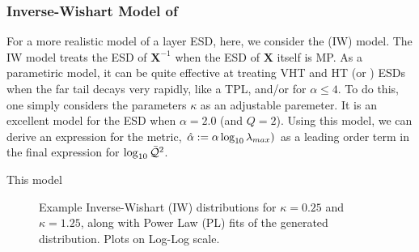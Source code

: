\subsubsection{Inverse-Wishart Model of \IdealLearning}
For a more realistic model of a layer ESD, 
here, we consider the \InverseWishart (IW) model.
The IW model treats the ESD of $\mathbf{X}^{-1}$ when the ESD of $\mathbf{X}$ itself is MP.
As a parametiric model, it can be quite effective at treating VHT and HT (or \FatTailed) ESDs when the far tail decays very rapidly, like a TPL, and/or for $\alpha\le 4$.
To do this, one simply considers the parameters $\kappa$ as an adjustable paremeter.
%
It is an excellent model for the ESD when $\alpha=2.0$ (and $Q=2$).
Using this model, we can derive an expression for the \HTSR \ALPHAHAT \LayerQuality metric,
$\hat\alpha :=\alpha\log_{10}\lambda_{max})$ as a leading order term in the final expression for $\log_{10}\bar{\mathcal{Q}}^{2}$.

This model 

\begin{figure}[h]
    \centering
      \caption{Example Inverse-Wishart (IW) distributions for $\kappa=0.25$ and $\kappa=1.25$,  along with Power Law (PL) fits of the generated distribution. Plots on Log-Log scale.}
  \label{fig:IWplots}                                                                                                      
\end{figure}   

